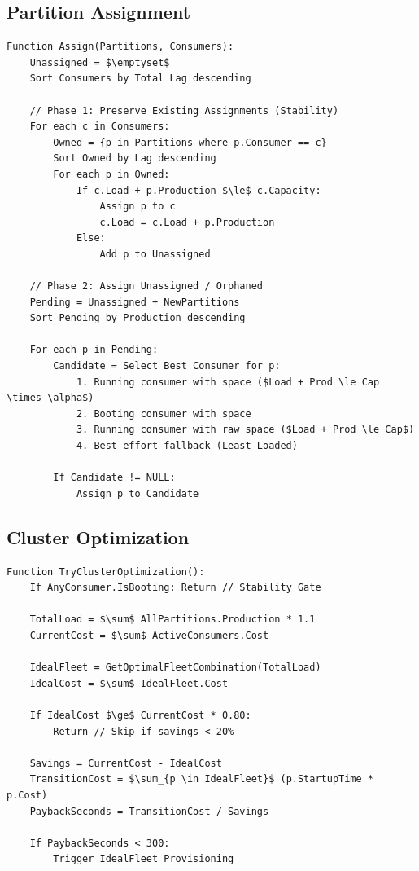 ﻿\documentclass[conference]{IEEEtran}
\begin{document}
\subsection{Partition Assignment}
\begin{lstlisting}[caption={Assign}, mathescape=true]
Function Assign(Partitions, Consumers):
    Unassigned = $\emptyset$
    Sort Consumers by Total Lag descending

    // Phase 1: Preserve Existing Assignments (Stability)
    For each c in Consumers:
        Owned = {p in Partitions where p.Consumer == c}
        Sort Owned by Lag descending
        For each p in Owned:
            If c.Load + p.Production $\le$ c.Capacity:
                Assign p to c
                c.Load = c.Load + p.Production
            Else:
                Add p to Unassigned

    // Phase 2: Assign Unassigned / Orphaned
    Pending = Unassigned + NewPartitions
    Sort Pending by Production descending

    For each p in Pending:
        Candidate = Select Best Consumer for p:
            1. Running consumer with space ($Load + Prod \le Cap \times \alpha$)
            2. Booting consumer with space
            3. Running consumer with raw space ($Load + Prod \le Cap$)
            4. Best effort fallback (Least Loaded)

        If Candidate != NULL:
            Assign p to Candidate
\end{lstlisting}

\subsection{Cluster Optimization}
\begin{lstlisting}[caption={TryClusterOptimization}, mathescape=true]
Function TryClusterOptimization():
    If AnyConsumer.IsBooting: Return // Stability Gate

    TotalLoad = $\sum$ AllPartitions.Production * 1.1
    CurrentCost = $\sum$ ActiveConsumers.Cost

    IdealFleet = GetOptimalFleetCombination(TotalLoad)
    IdealCost = $\sum$ IdealFleet.Cost

    If IdealCost $\ge$ CurrentCost * 0.80:
        Return // Skip if savings < 20%

    Savings = CurrentCost - IdealCost
    TransitionCost = $\sum_{p \in IdealFleet}$ (p.StartupTime * p.Cost)
    PaybackSeconds = TransitionCost / Savings

    If PaybackSeconds < 300:
        Trigger IdealFleet Provisioning
\end{lstlisting}
\end{document}
